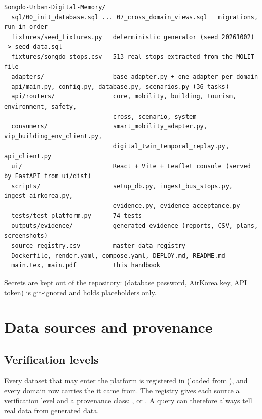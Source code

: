 \documentclass[11pt,a4paper]{article}
\begin{document}
\begin{lstlisting}[basicstyle=\ttfamily\scriptsize]
Songdo-Urban-Digital-Memory/
  sql/00_init_database.sql ... 07_cross_domain_views.sql   migrations, run in order
  fixtures/seed_fixtures.py   deterministic generator (seed 20261002) -> seed_data.sql
  fixtures/songdo_stops.csv   513 real stops extracted from the MOLIT file
  adapters/                   base_adapter.py + one adapter per domain
  api/main.py, config.py, database.py, scenarios.py (36 tasks)
  api/routers/                core, mobility, building, tourism, environment, safety,
                              cross, scenario, system
  consumers/                  smart_mobility_adapter.py, vip_building_env_client.py,
                              digital_twin_temporal_replay.py, api_client.py
  ui/                         React + Vite + Leaflet console (served by FastAPI from ui/dist)
  scripts/                    setup_db.py, ingest_bus_stops.py, ingest_airkorea.py,
                              evidence.py, evidence_acceptance.py
  tests/test_platform.py      74 tests
  outputs/evidence/           generated evidence (reports, CSV, plans, screenshots)
  source_registry.csv         master data registry
  Dockerfile, render.yaml, compose.yaml, DEPLOY.md, README.md
  main.tex, main.pdf          this handbook
\end{lstlisting}

Secrets are kept out of the repository:  (database password, AirKorea key, API
token) is git-ignored and  holds placeholders only.

\section{Data sources and provenance}\label{sec:sources}

\subsection{Verification levels}

Every dataset that may enter the platform is registered in 
(loaded from ), and every domain row carries the 
it came from. The registry gives each source a verification level and a provenance class:
,  or . A query can
therefore always tell real data from generated data.
\end{document}
